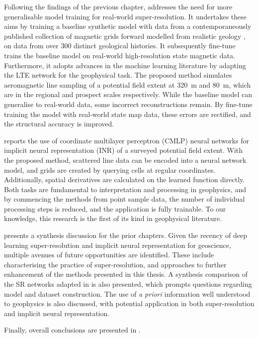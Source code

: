 Following the findings of the previous chapter,  addresses the need for more generalisable model training for real-world super-resolution.
It undertakes these aims by training a baseline synthetic model with data from a contemporaneously published collection of magnetic grids forward modelled from realistic geology \parencite{jessellNoddyverseMassiveData2022}, on data from over \num{300} distinct geological histories.
It subsequently fine-tune trains the baseline model on real-world high-resolution state magnetic data.
Furthermore, it adopts advances in the machine learning literature by adapting the LTE network \parencite{leeLocalTextureEstimator2022} for the geophysical task.
The proposed method simulates aeromagnetic line sampling of a potential field extent at \qty{320}{\m} and \qty{80}{\m}, which are in the regional and prospect scales respectively.
While the baseline model can generalise to real-world data, some incorrect reconstructions remain.
By fine-tune training the model with real-world state map data, these errors are rectified, and the structural accuracy is improved.

 reports the use of coordinate multilayer perceptron (CMLP) neural networks for implicit neural representation (INR) of a surveyed potential field extent.
With the proposed method, scattered line data can be encoded into a neural network model, and grids are created by querying cells at regular coordinates.
Additionally, spatial derivatives are calculated on the learned function directly.
Both tasks are fundamental to interpretation and processing in geophysics, and by commencing the methods from point sample data, the number of individual processing steps is reduced, and the application is fully trainable.
To our knowledge, this research is the first of its kind in geophysical literature.

 presents a synthesis discussion for the prior chapters.
Given the recency of deep learning super-resolution and implicit neural representation for geoscience, multiple avenues of future opportunities are identified.
These include characterising the practice of super-resolution, and approaches to further enhancement of the methods presented in this thesis.
A synthesis comparison of the SR networks adapted in  is also presented, which prompts questions regarding model and dataset construction.
The use of \emph{a priori} information well understood to geophysics is also discussed, with potential application in both super-resolution and implicit neural representation.

Finally, overall conclusions are presented in .


% 